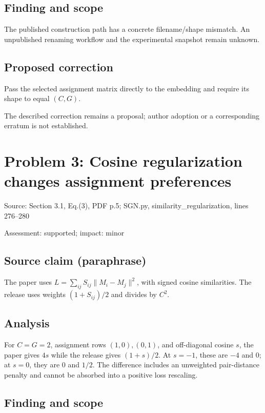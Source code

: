 \documentclass[11pt]{article}
\begin{document}
\subsection*{Finding and scope}

The published construction path has a concrete filename/shape mismatch. An unpublished renaming workflow and the experimental snapshot remain unknown.

\subsection*{Proposed correction}

Pass the selected assignment matrix directly to the embedding and require its shape to equal \((C,G)\).

The described correction remains a proposal; author adoption or a corresponding erratum is not established.

\section*{Problem 3: Cosine regularization changes assignment preferences}

Source: Section 3.1, Eq.(3), PDF p.5; SGN.py, similarity\_regularization, lines 276–280

Assessment: supported; impact: minor

\subsection*{Source claim (paraphrase)}

The paper uses \(L=\sum_{ij}S_{ij}\|M_i-M_j\|^2\), with signed cosine similarities. The release uses weights \((1+S_{ij})/2\) and divides by \(C^2\).

\subsection*{Analysis}

For \(C=G=2\), assignment rows \((1,0),(0,1)\), and off-diagonal cosine \(s\), the paper gives \(4s\) while the release gives \((1+s)/2\). At \(s=-1\), these are \(-4\) and \(0\); at \(s=0\), they are \(0\) and \(1/2\). The difference includes an unweighted pair-distance penalty and cannot be absorbed into a positive loss rescaling.

\subsection*{Finding and scope}
\end{document}
